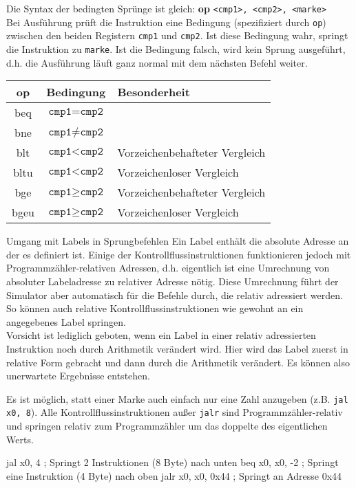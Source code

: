 Die Syntax der bedingten Sprünge ist gleich: \textbf{op} \texttt{<cmp1>, <cmp2>, <marke>}\\
Bei Ausführung prüft die Instruktion eine Bedingung (spezifiziert durch \texttt{op}) zwischen den beiden Registern \texttt{cmp1} und \texttt{cmp2}. Ist diese Bedingung wahr, springt die Instruktion zu \texttt{marke}. Ist die Bedingung falsch, wird kein Sprung ausgeführt, d.h. die Ausführung läuft ganz normal mit dem nächsten Befehl weiter.\\
\begin{tabular}{|c|c|l|}
	\hline
	op & Bedingung & Besonderheit\\
	\hline
	beq & $\texttt{cmp1} = \texttt{cmp2}$ & \\
	\hline
	bne & $\texttt{cmp1} \ne \texttt{cmp2}$ & \\
	\hline
	blt & $\texttt{cmp1} < \texttt{cmp2}$ & Vorzeichenbehafteter Vergleich\\
	\hline
	bltu & $\texttt{cmp1} < \texttt{cmp2}$ & Vorzeichenloser Vergleich\\
	\hline
	bge & $\texttt{cmp1} \ge \texttt{cmp2}$ & Vorzeichenbehafteter Vergleich\\
	\hline
	bgeu & $\texttt{cmp1} \ge \texttt{cmp2}$ & Vorzeichenloser Vergleich\\
	\hline
\end{tabular}

\begin{infoblock}{Umgang mit Labels in Sprungbefehlen}
  Ein Label enthält die absolute Adresse an der es definiert ist. Einige der
  Kontrollflussinstruktionen funktionieren jedoch mit Programmzähler-relativen
  Adressen, d.h. eigentlich ist eine Umrechnung von absoluter Labeladresse zu
  relativer Adresse nötig. Diese Umrechnung führt der Simulator aber automatisch
  für die Befehle durch, die relativ adressiert werden. So können auch relative
  Kontrollflussinstruktionen wie gewohnt an ein angegebenes Label springen.\\
	Vorsicht ist lediglich geboten, wenn ein Label in einer relativ adressierten
	Instruktion noch durch Arithmetik verändert wird. Hier wird das Label zuerst
	in relative Form gebracht und dann durch die Arithmetik verändert. Es können
	also unerwartete Ergebnisse entstehen.
\end{infoblock}

\begin{warningblock}
	Es ist möglich, statt einer Marke auch einfach nur eine Zahl anzugeben (z.B. \texttt{jal x0, 8}).
	Alle Kontrollflussinstruktionen außer \texttt{jalr} sind Programmzähler-relativ und springen relativ zum Programmzähler um das doppelte des eigentlichen Werts.\\
\begin{riscv}
jal x0, 4 ; Springt 2 Instruktionen (8 Byte) nach unten
beq x0, x0, -2 ; Springt eine Instruktion (4 Byte) nach oben
jalr x0, x0, 0x44 ; Springt an Adresse 0x44
\end{riscv}
\end{warningblock}


